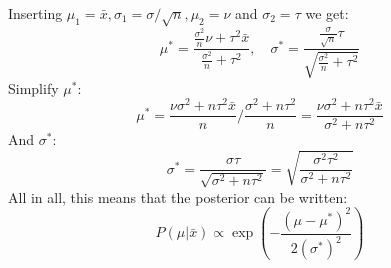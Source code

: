 \documentclass[12pt, a4paper]{article}
\begin{document}
Inserting $\mu_1=\bar{x}, \sigma_1=\sigma/\sqrt{n}, \mu_2=\nu$ and $\sigma_2=\tau$ we get:
\begin{equation}
\mu^*=\frac{\frac{\sigma^2}{n}\nu+\tau^2\bar{x}}{\frac{\sigma^2}{n}+\tau^2},\quad\sigma^*=\frac{\frac{\sigma}{\sqrt{n}}\tau}{\sqrt{\frac{\sigma^2}{n}+\tau^2}}
\end{equation}
Simplify $\mu^*$:
\begin{equation}
\mu^*=\frac{\nu\sigma^2+n\tau^2\bar{x}}{n}/\frac{\sigma^2+n\tau^2}{n}=\frac{\nu\sigma^2+n\tau^2\bar{x}}{\sigma^2+n\tau^2}
\end{equation}
And $\sigma^*$:
\begin{equation}
\sigma^*=\frac{\sigma\tau}{\sqrt{\sigma^2+n\tau^2}}=\sqrt{\frac{\sigma^2\tau^2}{\sigma^2+n\tau^2}}
\end{equation}
All in all, this means that the posterior can be written:
\begin{equation}
P(\mu|\bar{x})\propto\exp\left(-\frac{(\mu-\mu^*)^2}{2(\sigma^*)^2}\right)
\end{equation}
\end{document}
